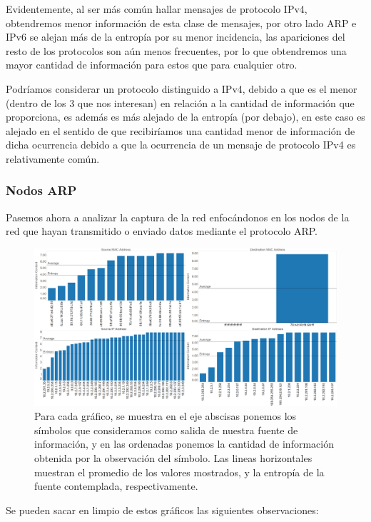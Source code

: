 \documentclass{article}
\theoremstyle{definition}
\theoremstyle{remark}
\begin{document}
Evidentemente, al ser más común hallar mensajes de protocolo IPv4, obtendremos menor información de esta clase de mensajes, por otro lado ARP e IPv6 se alejan más de la entropía por su menor incidencia, las apariciones del resto de los protocolos son aún menos frecuentes, por lo que obtendremos una mayor cantidad de información para estos que para cualquier otro.

Podríamos considerar un protocolo distinguido a IPv4, debido a que es el menor (dentro de los 3 que nos interesan) en relación a la cantidad de información que proporciona, es además es más alejado de la entropía (por debajo), en este caso es alejado en el sentido de que recibiríamos una cantidad menor de información de dicha ocurrencia debido a que la ocurrencia de un mensaje de protocolo IPv4 es relativamente común.

\subsubsection{Nodos ARP}

Pasemos ahora a analizar la captura de la red enfocándonos en los nodos de la red que hayan transmitido o enviado datos mediante el protocolo ARP.

\begin{figure}[H]
\centering
\includegraphics[width=450pt]{captures/LabosDC/PDFs Dashboard.png}
\caption{Para cada gráfico, se muestra en el eje abscisas ponemos los símbolos que consideramos como salida de nuestra fuente de información, y en las ordenadas ponemos la cantidad de información obtenida por la observación del símbolo. Las lineas horizontales muestran el promedio de los valores mostrados, y la entropía de la fuente contemplada, respectivamente.}
\end{figure}

Se pueden sacar en limpio de estos gráficos las siguientes observaciones:
\end{document}

